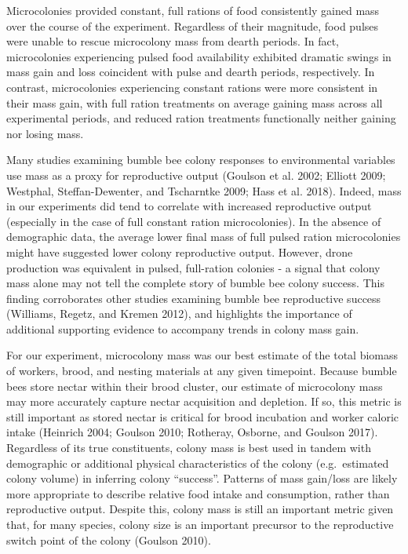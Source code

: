 \documentclass[11pt,]{article}
\begin{document}
Microcolonies provided constant, full rations of food consistently
gained mass over the course of the experiment. Regardless of their
magnitude, food pulses were unable to rescue microcolony mass from
dearth periods. In fact, microcolonies experiencing pulsed food
availability exhibited dramatic swings in mass gain and loss coincident
with pulse and dearth periods, respectively. In contrast, microcolonies
experiencing constant rations were more consistent in their mass gain,
with full ration treatments on average gaining mass across all
experimental periods, and reduced ration treatments functionally neither
gaining nor losing mass.

Many studies examining bumble bee colony responses to environmental
variables use mass as a proxy for reproductive output (Goulson et al.
2002; Elliott 2009; Westphal, Steffan-Dewenter, and Tscharntke 2009;
Hass et al. 2018). Indeed, mass in our experiments did tend to correlate
with increased reproductive output (especially in the case of full
constant ration microcolonies). In the absence of demographic data, the
average lower final mass of full pulsed ration microcolonies might have
suggested lower colony reproductive output. However, drone production
was equivalent in pulsed, full-ration colonies - a signal that colony
mass alone may not tell the complete story of bumble bee colony success.
This finding corroborates other studies examining bumble bee
reproductive success (Williams, Regetz, and Kremen 2012), and highlights
the importance of additional supporting evidence to accompany trends in
colony mass gain.

For our experiment, microcolony mass was our best estimate of the total
biomass of workers, brood, and nesting materials at any given timepoint.
Because bumble bees store nectar within their brood cluster, our
estimate of microcolony mass may more accurately capture nectar
acquisition and depletion. If so, this metric is still important as
stored nectar is critical for brood incubation and worker caloric intake
(Heinrich 2004; Goulson 2010; Rotheray, Osborne, and Goulson 2017).
Regardless of its true constituents, colony mass is best used in tandem
with demographic or additional physical characteristics of the colony
(e.g.~estimated colony volume) in inferring colony ``success''. Patterns
of mass gain/loss are likely more appropriate to describe relative food
intake and consumption, rather than reproductive output. Despite this,
colony mass is still an important metric given that, for many species,
colony size is an important precursor to the reproductive switch point
of the colony (Goulson 2010).
\end{document}
